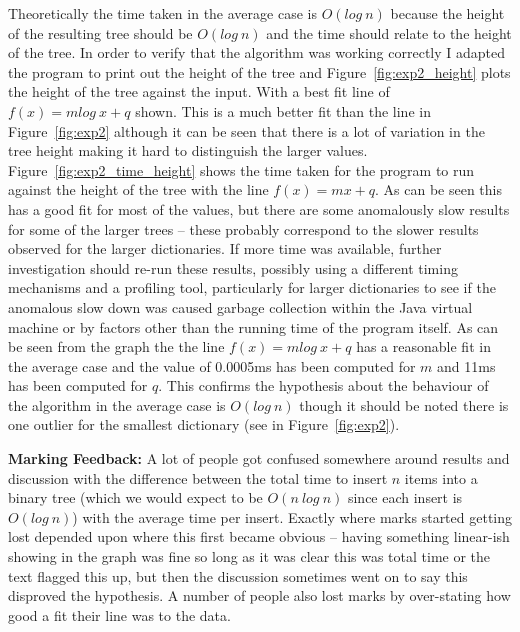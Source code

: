 Theoretically the time taken in the average case is $O(log~n)$ because the height of the resulting tree should be $O(log~n)$ and the time should relate to the height of the tree.  In order to verify that the algorithm was working correctly I adapted the program to print out the height of the tree and Figure~\ref{fig:exp2_height} plots the height of the tree against the input.  With a best fit line of $f(x) = m log~x + q$ shown.  This is a much better fit than the line in Figure~\ref{fig:exp2} although it can be seen that there is a lot of variation in the tree height making it hard to distinguish the larger values.  Figure~\ref{fig:exp2_time_height} shows the time taken for the program to run against the height of the tree with the line $f(x) = mx + q$.  As can be seen this has a good fit for most of the values, but there are some anomalously slow results for some of the larger trees -- these probably correspond to the slower results observed for the larger dictionaries.  If more time was available, further investigation should re-run these results, possibly using a different timing mechanisms and a profiling tool, particularly for larger dictionaries to see if the anomalous slow down was caused garbage collection within the Java virtual machine or by factors other than the running time of the program itself.
\fi
 \ifpython As can be seen from the graph the the line $f(x) = m log~x + q$ has a reasonable fit in the average case and the value of 0.0005ms has been computed for $m$ and 11ms has been computed for $q$.  This confirms the hypothesis about the behaviour of the algorithm in the average case  is $O(log~n)$ though it should be noted there is one outlier for the smallest dictionary (see in Figure~\ref{fig:exp2}).
 

 \fi %

{\bf Marking Feedback:} A lot of people got confused somewhere around results and discussion with the difference between the total time to insert $n$ items into a binary tree (which we would expect to be $O(n~log~n)$ since each insert is $O(log~n)$) with the average time per insert.   Exactly where marks started getting lost depended upon where this first became obvious -- having something linear-ish showing in the graph was fine so long as it was clear this was total time or the text flagged this up, but then the discussion sometimes went on to say this disproved the hypothesis.  A number of people also lost marks by over-stating how good a fit their line was to the data.
